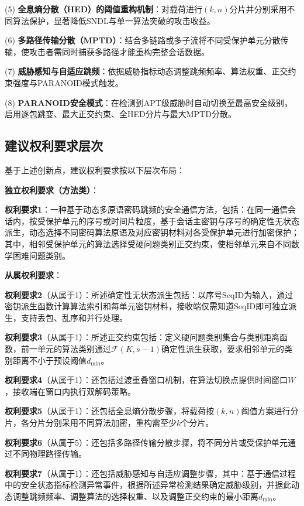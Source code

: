 ﻿\documentclass[12pt,a4paper]{article}
\begin{document}
(5) \textbf{全息熵分散（HED）的阈值重构机制}：对载荷进行$(k,n)$分片并分别采用不同算法保护，显著降低SNDL与单一算法突破的攻击收益。

(6) \textbf{多路径传输分散（MPTD）}：结合多链路或多子流将不同受保护单元分散传输，使攻击者需同时捕获多路径才能重构完整会话数据。

(7) \textbf{威胁感知与自适应跳频}：依据威胁指标动态调整跳频频率、算法权重、正交约束强度与PARANOID模式触发。

(8) \textbf{PARANOID安全模式}：在检测到APT级威胁时自动切换至最高安全级别，启用逐包跳变、最大正交约束、全HED分片与最大MPTD分散。

\subsection{建议权利要求层次}

基于上述创新点，建议权利要求按以下层次布局：

\textbf{独立权利要求（方法类）}：

\textbf{权利要求1}：一种基于动态多原语密码跳频的安全通信方法，包括：在同一通信会话内，按受保护单元的序号或时间片粒度，基于会话主密钥与序号的确定性无状态派生，动态选择不同密码算法原语及对应密钥材料对各受保护单元进行加密保护；其中，相邻受保护单元的算法选择受硬问题类别正交约束，使相邻单元来自不同数学困难问题类别。

\textbf{从属权利要求}：

\textbf{权利要求2}（从属于1）：所述确定性无状态派生包括：以序号$\text{SeqID}$为输入，通过密钥派生函数计算算法索引和每单元密钥材料，接收端仅需知道$\text{SeqID}$即可独立派生，支持丢包、乱序和并行处理。

\textbf{权利要求3}（从属于1）：所述正交约束包括：定义硬问题类别集合与类别距离函数，前一单元的算法类别通过$\mathcal{F}(K, s-1)$确定性派生获取，要求相邻单元的类别距离不小于预设阈值$d_{\min}$。

\textbf{权利要求4}（从属于1）：还包括过渡重叠窗口机制，在算法切换点提供时间窗口$W$，接收端在窗口内执行双解码策略。

\textbf{权利要求5}（从属于1）：还包括全息熵分散步骤，将载荷按$(k,n)$阈值方案进行分片，各分片分别采用不同算法加密，重构需至少$k$个分片。

\textbf{权利要求6}（从属于5）：还包括多路径传输分散步骤，将不同分片或受保护单元通过不同物理路径传输。

\textbf{权利要求7}（从属于1）：还包括威胁感知与自适应调整步骤，其中：基于通信过程中的安全状态指标检测异常事件，根据所述异常检测结果确定威胁级别，并据此动态调整跳频频率、调整算法的选择权重、以及调整正交约束的最小距离$d_{\min}$。
\end{document}
